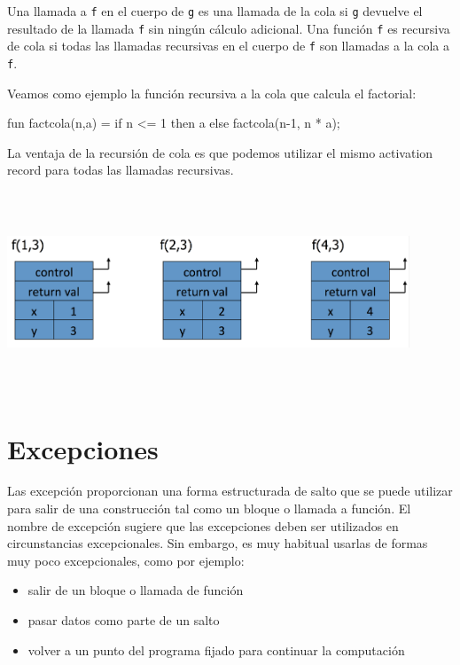 \documentclass[10pt,a4paper]{report}
\begin{document}
Una llamada a \verb|f| en el cuerpo de \verb|g| es una
llamada de la cola si \verb|g| devuelve el resultado de la llamada
\verb|f| sin ningún cálculo adicional. Una función \verb|f| es recursiva de cola si todas las llamadas recursivas en el cuerpo de \verb|f| son llamadas a la cola a \verb|f|. 

Veamos como ejemplo la función recursiva a la cola que calcula el factorial:

\begin{tabbing}
fun factcola(n,a) = if n <= 1 then a else factcola(n-1, n * a);
\end{tabbing}

La ventaja de la recursión de cola es que podemos utilizar el mismo activation record para todas las llamadas recursivas.

    \begin{center}  
        \includegraphics[width=12cm, height=6cm]{factorial2.png}
    \end{center}

\section{Excepciones}

Las excepción proporcionan una forma estructurada de salto que se
puede utilizar para salir de una construcción tal como un bloque o
llamada a función. El nombre de excepción sugiere que las excepciones
deben ser utilizados en circunstancias excepcionales. Sin embargo, es
muy habitual usarlas de formas muy poco excepcionales, como por
ejemplo:

\begin{itemize}
\item salir de un bloque o llamada de función
\item pasar datos como parte de un salto
\item volver a un punto del programa fijado para continuar la computación
\end{itemize}
\end{document}

